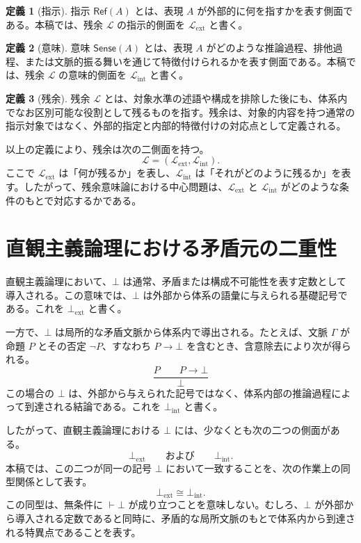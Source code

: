 \documentclass[11pt,a4paper]{article}
\newcommand{\lhagma}{\mathcal{L}}
\newcommand{\refe}{\mathsf{Ref}}
\newcommand{\sense}{\mathsf{Sense}}
\newcommand{\ctx}{\Gamma}
\newcommand{\botext}{\bot_{\mathrm{ext}}}
\newcommand{\botint}{\bot_{\mathrm{int}}}
\newcommand{\lext}{\lhagma_{\mathrm{ext}}}
\newcommand{\lint}{\lhagma_{\mathrm{int}}}
\theoremstyle{definition}
\newtheorem{definition}{定義}[section]
\begin{document}
\begin{definition}[指示]
指示 $\refe(A)$ とは、表現 $A$ が外部的に何を指すかを表す側面である。本稿では、残余 $\lhagma$ の指示的側面を $\lext$ と書く。
\end{definition}

\begin{definition}[意味]
意味 $\sense(A)$ とは、表現 $A$ がどのような推論過程、排他過程、または文脈的振る舞いを通じて特徴付けられるかを表す側面である。本稿では、残余 $\lhagma$ の意味的側面を $\lint$ と書く。
\end{definition}

\begin{definition}[残余]
残余 $\lhagma$ とは、対象水準の述語や構成を排除した後にも、体系内でなお区別可能な役割として残るものを指す。残余は、対象的内容を持つ通常の指示対象ではなく、外部的指定と内部的特徴付けの対応点として定義される。
\end{definition}

以上の定義により、残余は次の二側面を持つ。
\[
\lhagma = (\lext, \lint).
\]
ここで $\lext$ は「何が残るか」を表し、$\lint$ は「それがどのように残るか」を表す。したがって、残余意味論における中心問題は、$\lext$ と $\lint$ がどのような条件のもとで対応するかである。

\section{直観主義論理における矛盾元の二重性}

直観主義論理において、$\bot$ は通常、矛盾または構成不可能性を表す定数として導入される。この意味では、$\bot$ は外部から体系の語彙に与えられる基礎記号である。これを $\botext$ と書く。

一方で、$\bot$ は局所的な矛盾文脈から体系内で導出される。たとえば、文脈 $\ctx$ が命題 $P$ とその否定 $\neg P$、すなわち $P \to \bot$ を含むとき、含意除去により次が得られる。
\[
\frac{P \qquad P \to \bot}{\bot}
\]
この場合の $\bot$ は、外部から与えられた記号ではなく、体系内部の推論過程によって到達される結論である。これを $\botint$ と書く。

したがって、直観主義論理における $\bot$ には、少なくとも次の二つの側面がある。
\[
\botext \qquad \text{および} \qquad \botint .
\]
本稿では、この二つが同一の記号 $\bot$ において一致することを、次の作業上の同型関係として表す。
\[
\botext \cong \botint .
\]
この同型は、無条件に $\vdash \bot$ が成り立つことを意味しない。むしろ、$\bot$ が外部から導入される定数であると同時に、矛盾的な局所文脈のもとで体系内から到達される特異点であることを表す。
\end{document}
